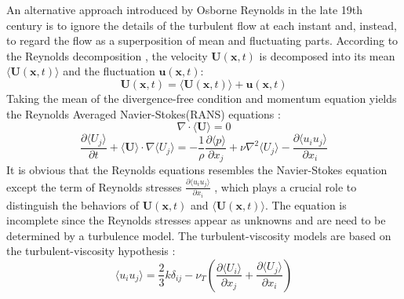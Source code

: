An alternative approach introduced by Osborne Reynolds in the late 19th century is to ignore the details of the turbulent flow at each instant and, instead, to regard the flow as a superposition of mean and fluctuating parts. According to the Reynolds decomposition \cite{PopeTurbulent2000}, the velocity $\mathbf{U}(\mathbf{x}, t)$ is decomposed into its mean $\langle\mathbf{U}(\mathbf{x},t)\rangle$ and the fluctuation $\mathbf{u}(\mathbf{x},t)$:
\begin{equation}
\mathbf{U}(\mathbf{x},t) = \langle\mathbf{U}(\mathbf{x},t)\rangle + \mathbf{u}(\mathbf{x},t)
\label{reynolds_decomp}
\end{equation}
Taking the mean of the divergence-free condition  and momentum equation  yields the Reynolds Averaged Navier-Stokes(RANS) equations \cite{reynolds1894dynamical}:
\begin{equation}
\nabla\cdot\langle\mathbf{U}\rangle = 0
\label{div_free_U}
\end{equation}
\begin{equation}
\frac{\partial \langle U_j\rangle}{\partial t} + \langle \mathbf{U}\rangle
\cdot \nabla\langle U_j\rangle = 
- \frac{1}{\rho}\frac{\partial \langle p\rangle}{\partial x_j} + \nu\nabla^2\langle U_j\rangle - \frac{\partial\langle u_iu_j\rangle}{\partial x_i}
\label{reynolds_eqn}
\end{equation}
It is obvious that the Reynolds equations  resembles the Navier-Stokes equation  except the term of Reynolds stresses $\frac{\partial\langle u_iu_j\rangle}{\partial x_i}$ \cite{PopeTurbulent2000}, which plays a crucial role to distinguish the behaviors of $\mathbf{U}(\mathbf{x},t)$ and $\langle\mathbf{U}(\mathbf{x},t)\rangle$. The equation  is incomplete since the Reynolds stresses appear as unknowns and are need to be determined by a turbulence model. The turbulent-viscosity models are based on the turbulent-viscosity hypothesis \cite{schmitt2007boussinesq}: 
\begin{equation}
\langle u_iu_j\rangle = \frac{2}{3}k\delta_{ij} 
- \nu_T(\frac{\partial\langle U_i\rangle}{\partial x_j} + 
\frac{\partial\langle U_j\rangle}{\partial x_i})
\label{visc_hypo}
\end{equation}   
